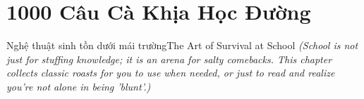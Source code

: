 \chapter{1000 Câu Cà Khịa Học Đường}

\begin{truyen}{Nghệ thuật sinh tồn dưới mái trường}{The Art of Survival at School}
\textit{\color{v3teal}(School is not just for stuffing knowledge; it is an arena for salty comebacks. This chapter collects classic roasts for you to use when needed, or just to read and realize you're not alone in being 'blunt'.)}
\end{truyen}

